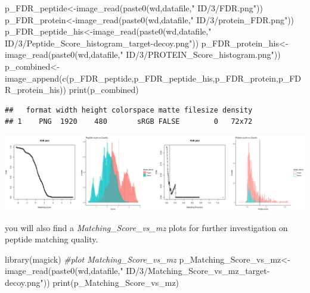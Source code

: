 \documentclass[
]{article}
\newenvironment{Shaded}{\begin{snugshade}}{\end{snugshade}}
\newcommand{\CommentTok}[1]{\textcolor[rgb]{0.56,0.35,0.01}{\textit{#1}}}
\newcommand{\FunctionTok}[1]{\textcolor[rgb]{0.00,0.00,0.00}{#1}}
\newcommand{\NormalTok}[1]{#1}
\newcommand{\OtherTok}[1]{\textcolor[rgb]{0.56,0.35,0.01}{#1}}
\newcommand{\StringTok}[1]{\textcolor[rgb]{0.31,0.60,0.02}{#1}}
\begin{document}
\begin{Shaded}
\begin{Highlighting}[]
\NormalTok{p\_FDR\_peptide}\OtherTok{\textless{}{-}}\FunctionTok{image\_read}\NormalTok{(}\FunctionTok{paste0}\NormalTok{(wd,datafile,}\StringTok{" ID/3/FDR.png"}\NormalTok{))}
\NormalTok{p\_FDR\_protein}\OtherTok{\textless{}{-}}\FunctionTok{image\_read}\NormalTok{(}\FunctionTok{paste0}\NormalTok{(wd,datafile,}\StringTok{" ID/3/protein\_FDR.png"}\NormalTok{))}
\NormalTok{p\_FDR\_peptide\_his}\OtherTok{\textless{}{-}}\FunctionTok{image\_read}\NormalTok{(}\FunctionTok{paste0}\NormalTok{(wd,datafile,}\StringTok{" ID/3/Peptide\_Score\_histogram\_target{-}decoy.png"}\NormalTok{))}
\NormalTok{p\_FDR\_protein\_his}\OtherTok{\textless{}{-}}\FunctionTok{image\_read}\NormalTok{(}\FunctionTok{paste0}\NormalTok{(wd,datafile,}\StringTok{" ID/3/PROTEIN\_Score\_histogram.png"}\NormalTok{))}
\NormalTok{p\_combined}\OtherTok{\textless{}{-}}\FunctionTok{image\_append}\NormalTok{(}\FunctionTok{c}\NormalTok{(p\_FDR\_peptide,p\_FDR\_peptide\_his,p\_FDR\_protein,p\_FDR\_protein\_his))}
\FunctionTok{print}\NormalTok{(p\_combined)}
\end{Highlighting}
\end{Shaded}

\begin{verbatim}
##   format width height colorspace matte filesize density
## 1    PNG  1920    480       sRGB FALSE        0   72x72
\end{verbatim}

\includegraphics[width=26.67in]{README_files/figure-latex/FDR plot-2}

you will also find a \emph{Matching\_Score\_vs\_mz} plots for further
investigation on peptide matching quality.

\begin{Shaded}
\begin{Highlighting}[]
\FunctionTok{library}\NormalTok{(magick)}
\CommentTok{\#plot Matching\_Score\_vs\_mz}
\NormalTok{p\_Matching\_Score\_vs\_mz}\OtherTok{\textless{}{-}}\FunctionTok{image\_read}\NormalTok{(}\FunctionTok{paste0}\NormalTok{(wd,datafile,}\StringTok{" ID/3/Matching\_Score\_vs\_mz\_target{-}decoy.png"}\NormalTok{))}
\FunctionTok{print}\NormalTok{(p\_Matching\_Score\_vs\_mz)}
\end{Highlighting}
\end{Shaded}
\end{document}
